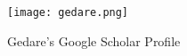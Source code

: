 \begin{figure} [htpd]
\centerline{\texttt{[image: gedare.png]}}
\caption{ Gedare's Google Scholar Profile}
\label{Fig.1}
\end{figure}






%
%



%
%


